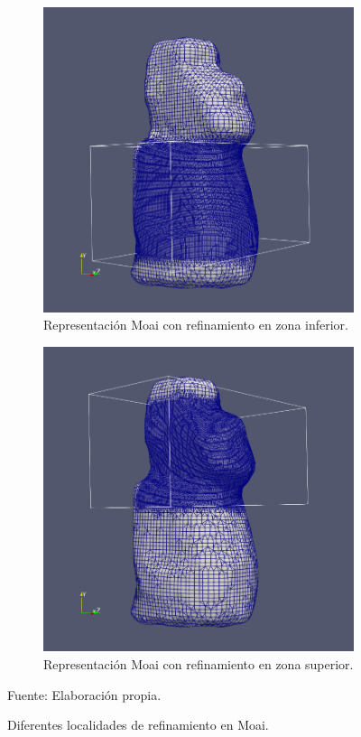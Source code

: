 \begin{figure}[!ht]
    \centering
    \begin{subfigure}[t]{0.45\textwidth}
        \includegraphics[width=1.0\textwidth]{figures/meshes/moai_5r7_01.png}
        \caption{Representación Moai con refinamiento en zona inferior.}
    \end{subfigure}
    \begin{subfigure}[t]{0.45\textwidth}
        \includegraphics[width=1.0\textwidth]{figures/meshes/moai_5r7_2_01.png}
        \caption{ Representación Moai con refinamiento en zona superior. }
    \end{subfigure}
    \caption{ Diferentes localidades de refinamiento en Moai. }
    Fuente: Elaboración propia.
    \label{fig:moai_5r7_all}
\end{figure}

